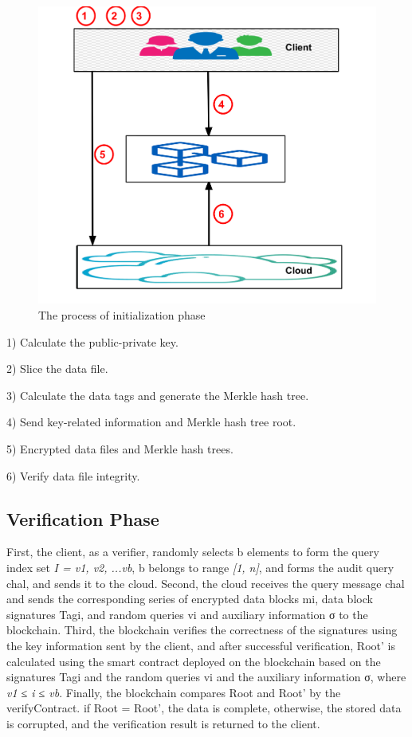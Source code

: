 \begin{figure}[H]
    \centering
    \includegraphics[scale=0.2]{figures/Untitled drawing (3).png}
    \caption{The process of initialization phase}
 
\end{figure}

1) Calculate the public-private key.

2) Slice the data file.

3) Calculate the data tags and generate the Merkle hash tree.

4) Send key-related information and Merkle hash tree root.

5) Encrypted data files and Merkle hash trees.

6) Verify data file integrity.

\subsection{Verification Phase}

First, the client, as a verifier, randomly selects b elements to 
form the query index set \textit{I = {v1, v2, ...vb}}, b belongs to range \textit{[1, n]}, and forms the audit query chal, and sends it to the cloud.
Second, the cloud receives the query message chal and 
sends the corresponding series of encrypted data blocks mi, 
data block signatures Tagi, and random queries vi and auxiliary 
information σ to the blockchain.
Third, the blockchain verifies the correctness of the 
signatures using the key information sent by the client, and 
after successful verification, Root' is calculated using the smart 
contract deployed on the blockchain based on the signatures 
Tagi and the random queries vi and the auxiliary information σ, 
where \textit{v1 ≤ i ≤ vb}.
Finally, the blockchain compares Root and Root' by the 
verifyContract. if Root = Root', the data is complete, otherwise,
the stored data is corrupted, and the verification result is 
returned to the client.

